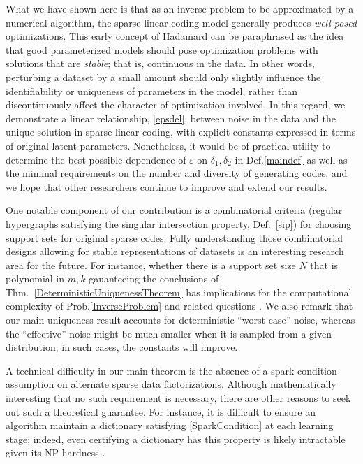 \documentclass[9pt,twocolumn]{pnas-new}
\begin{document}
What we have shown here is that as an inverse problem to be approximated by a numerical algorithm, the sparse linear coding model  generally produces \textit{well-posed} optimizations.  This early concept of Hadamard \cite{Hadamard1902} can be paraphrased as the idea that good parameterized models should pose optimization problems with solutions that are \textit{stable}; that is, continuous in the data.  In other words, perturbing a dataset by a small amount should only slightly influence the identifiability or uniqueness of parameters in the model, rather than discontinuously affect the character of optimization involved.  In this regard, we demonstrate a linear relationship, \eqref{epsdel}, between noise in the data and the unique solution in  sparse linear coding, with explicit constants expressed in terms of original latent parameters. 
Nonetheless, it would be of practical utility to determine the best possible dependence of $\varepsilon$ on $\delta_1, \delta_2$ in Def.\ref{maindef} as well as the minimal requirements on the number and diversity of generating codes, and we hope that other researchers continue to improve and extend our results.

One notable component of our contribution is a combinatorial criteria (regular hypergraphs satisfying the singular intersection property, Def.~\ref{sip}) for choosing support sets for original sparse codes. Fully understanding those combinatorial designs allowing for stable representations of datasets is an interesting research area for the future.  For instance, whether there is a support set size $N$ that is polynomial in $m,k$ gauanteeing the conclusions of Thm.~\ref{DeterministicUniquenessTheorem} has implications for the computational complexity of Prob.\ref{InverseProblem} and related questions \cite{Tillmann15}.  We also remark that our main uniqueness result accounts for deterministic ``worst-case'' noise, whereas the ``effective'' noise might be much smaller when it is sampled from a given distribution; in such cases, the constants  %
will improve. %

A technical difficulty in our main theorem is the absence of a spark condition assumption on alternate sparse data factorizations.
Although mathematically interesting that no such requirement is necessary, there are other reasons to seek out such a theoretical guarantee. For instance, it is difficult to ensure an algorithm maintain a dictionary satisfying \eqref{SparkCondition} at each learning stage; indeed, even certifying  a dictionary has this property is likely intractable given its NP-hardness \cite{tillmann2014computational}.
\end{document}
